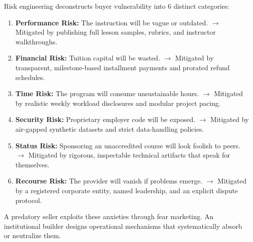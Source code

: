 Risk engineering deconstructs buyer vulnerability into 6 distinct categories:
\begin{enumerate}
\item \textbf{Performance Risk:} The instruction will be vague or outdated. $\rightarrow$ Mitigated by publishing full lesson samples, rubrics, and instructor walkthroughs.
\item \textbf{Financial Risk:} Tuition capital will be wasted. $\rightarrow$ Mitigated by transparent, milestone-based installment payments and prorated refund schedules.
\item \textbf{Time Risk:} The program will consume unsustainable hours. $\rightarrow$ Mitigated by realistic weekly workload disclosures and modular project pacing.
\item \textbf{Security Risk:} Proprietary employer code will be exposed. $\rightarrow$ Mitigated by air-gapped synthetic datasets and strict data-handling policies.
\item \textbf{Status Risk:} Sponsoring an unaccredited course will look foolish to peers. $\rightarrow$ Mitigated by rigorous, inspectable technical artifacts that speak for themselves.
\item \textbf{Recourse Risk:} The provider will vanish if problems emerge. $\rightarrow$ Mitigated by a registered corporate entity, named leadership, and an explicit dispute protocol.
\end{enumerate}

A predatory seller exploits these anxieties through fear marketing. An institutional builder designs operational mechanisms that systematically absorb or neutralize them.
